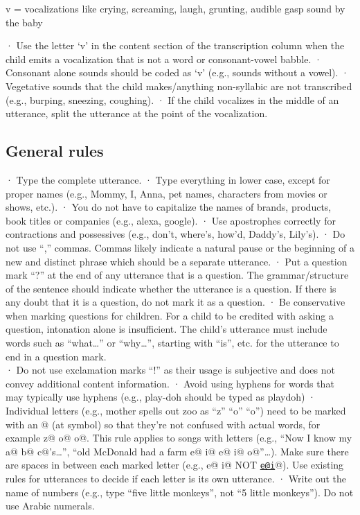 \documentclass[
  12pt,
]{book}
\begin{document}
v = vocalizations like crying, screaming, laugh, grunting, audible gasp sound by the baby

· Use the letter `v' in the content section of the transcription column when the child emits a vocalization that is not a word or consonant-vowel babble.
· Consonant alone sounds should be coded as `v' (e.g., sounds without a vowel).
· Vegetative sounds that the child makes/anything non-syllabic are not transcribed (e.g., burping, sneezing, coughing).
· If the child vocalizes in the middle of an utterance, split the utterance at the point of the vocalization.

\hypertarget{general-rules}{%
\subsection{General rules}\label{general-rules}}

· Type the complete utterance.
· Type everything in lower case, except for proper names (e.g., Mommy, I, Anna, pet names, characters from movies or shows, etc.).
· You do not have to capitalize the names of brands, products, book titles or companies (e.g., alexa, google).
· Use apostrophes correctly for contractions and possessives (e.g., don't, where's, how'd, Daddy's, Lily's).
· Do not use ``,'' commas. Commas likely indicate a natural pause or the beginning of a new and distinct phrase which should be a separate utterance.
· Put a question mark ``?'' at the end of any utterance that is a question. The grammar/structure of the sentence should indicate whether the utterance is a question. If there is any doubt that it is a question, do not mark it as a question.
· Be conservative when marking questions for children. For a child to be credited with asking a question, intonation alone is insufficient. The child's utterance must include words such as ``what\ldots{}'' or ``why\ldots{}'', starting with ``is'', etc. for the utterance to end in a question mark.\\
· Do not use exclamation marks ``!'' as their usage is subjective and does not convey additional content information.
· Avoid using hyphens for words that may typically use hyphens (e.g., play-doh should be typed as playdoh)
· Individual letters (e.g., mother spells out zoo as ``z'' ``o'' ``o'') need to be marked with an @ (at symbol) so that they're not confused with actual words, for example z@ o@ o@. This rule applies to songs with letters (e.g., ``Now I know my a@ b@ c@'s\ldots{}'', ``old McDonald had a farm e@ i@ e@ i@ o@''\ldots). Make sure there are spaces in between each marked letter (e.g., e@ i@ NOT \href{mailto:e@i}{\nolinkurl{e@i}}@). Use existing rules for utterances to decide if each letter is its own utterance.
· Write out the name of numbers (e.g., type ``five little monkeys'', not ``5 little monkeys''). Do not use Arabic numerals.
\end{document}
